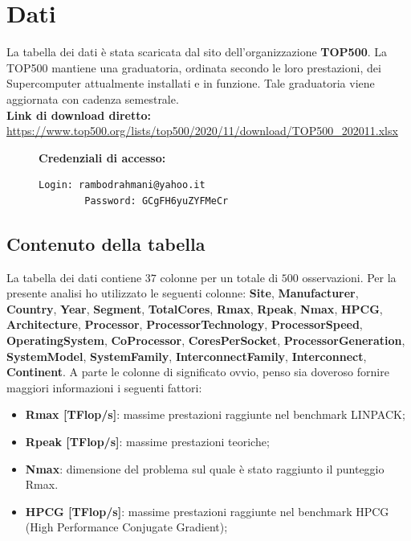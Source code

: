 \documentclass[11pt,a4paper]{article}
\begin{document}
\section{Dati}
La tabella dei dati \`e stata scaricata dal sito dell'organizzazione
\textbf{TOP500}. La TOP500 mantiene una graduatoria, ordinata secondo le loro
prestazioni, dei Supercomputer attualmente installati e in funzione. Tale
graduatoria viene aggiornata con cadenza semestrale.\\
\textbf{Link di download diretto:} \url{https://www.top500.org/lists/top500/2020/11/download/TOP500_202011.xlsx}\\
\begin{figure}[h]
	\vspace{-1cm}
	\begin{minipage}{.3\textwidth}
		\textbf{Credenziali di accesso:}
	\end{minipage}
	\begin{minipage}{0.7\textwidth} 
		\begin{lstlisting}[language=bash,tabsize=2,backgroundcolor=\color{Goldenrod}]
		Login: rambodrahmani@yahoo.it
		Password: GCgFH6yuZYFMeCr
		\end{lstlisting}
	\end{minipage}
	\vspace{-1cm}
\end{figure}
\subsection{Contenuto della tabella}
La tabella dei dati contiene $37$ colonne per un totale di $500$ osservazioni.
Per la presente analisi ho utilizzato le seguenti colonne: \textbf{Site},
\textbf{Manufacturer}, \textbf{Country}, \textbf{Year}, \textbf{Segment},
\textbf{TotalCores}, \textbf{Rmax}, \textbf{Rpeak}, \textbf{Nmax},
\textbf{HPCG}, \textbf{Architecture}, \textbf{Processor},
\textbf{ProcessorTechnology}, \textbf{ProcessorSpeed}, \textbf{OperatingSystem},
\textbf{CoProcessor}, \textbf{CoresPerSocket}, \textbf{ProcessorGeneration},
\textbf{SystemModel}, \textbf{SystemFamily}, \textbf{InterconnectFamily},
\textbf{Interconnect}, \textbf{Continent}. A parte le colonne di significato
ovvio, penso sia doveroso fornire maggiori informazioni i seguenti fattori:
\begin{itemize}
	\setlength\itemsep{0mm}
	\item \textbf{Rmax [TFlop/s]}: massime prestazioni raggiunte nel
		benchmark LINPACK;
	\item \textbf{Rpeak [TFlop/s]}: massime prestazioni teoriche;
	\item \textbf{Nmax}: dimensione del problema sul quale \`e stato
		raggiunto il punteggio Rmax.
	\item \textbf{HPCG [TFlop/s]}: massime prestazioni raggiunte nel
		benchmark HPCG (High Performance Conjugate Gradient);
\end{itemize}
\end{document}

